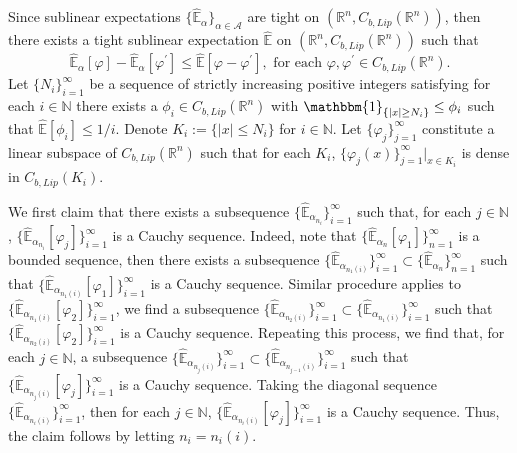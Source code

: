 \documentclass[a4paper,oneside,10pt]{article}%
\numberwithin{equation}{section}
\begin{document}
Since sublinear expectations $\{ \mathbb{\hat{E}}_{\alpha}\}_{\alpha
\in \mathcal{A}}$ are tight on $(\mathbb{R}^{n},C_{b,Lip}(\mathbb{R}^{n}))$,
then there exists a tight sublinear expectation $\mathbb{\hat{E}}$ on
$(\mathbb{R}^{n},C_{b,Lip}(\mathbb{R}^{n}))$ such that
\[
\mathbb{\hat{E}}_{\alpha}[\varphi]-\mathbb{\hat{E}}_{\alpha}[\varphi^{\prime
}]\leq \mathbb{\hat{E}}[\varphi-\varphi^{\prime}],\text{ for each }%
\varphi,\varphi^{\prime}\in C_{b,Lip}(\mathbb{R}^{n}).
\]
Let $\{N_{i}\}_{i=1}^{\infty}$ be a sequence of strictly increasing positive
integers satisfying for each $i\in \mathbb{N}$ there exists a $\phi_{i}\in
C_{b,Lip}(\mathbb{R}^{n})$ with $\mathbbm{1}_{\{|x|\geq N_{i}\}}\leq \phi_{i}$
such that $\mathbb{\hat{E}}[\phi_{i}]\leq1/i$. Denote $K_{i}:=\{|x|\leq
N_{i}\}$ for $i\in \mathbb{N}$. Let $\{ \varphi_{j}\}_{j=1}^{\infty}$
constitute a linear subspace of $C_{b,Lip}(\mathbb{R}^{n})$ such that for each
$K_{i}$, $\{ \varphi_{j}(x)\}_{j=1}^{\infty}|_{x\in K_{i}}$ is dense in
$C_{b,Lip}(K_{i})$.

We first claim that there exists a subsequence $\{ \mathbb{\hat{E}}%
_{\alpha_{n_{i}}}\}_{i=1}^{\infty}$ such that, for each $j\in \mathbb{N}$, $\{
\mathbb{\hat{E}}_{\alpha_{n_{i}}}[\varphi_{j}]\}_{i=1}^{\infty}$ is a Cauchy
sequence. Indeed, note that $\{ \mathbb{\hat{E}}_{\alpha_{n}}[\varphi
_{1}]\}_{n=1}^{\infty}$ is a bounded sequence, then there exists a subsequence
$\{ \mathbb{\hat{E}}_{\alpha_{n_{1}(i)}}\}_{i=1}^{\infty}\subset \{
\mathbb{\hat{E}}_{\alpha_{n}}\}_{n=1}^{\infty}$ such that $\{ \mathbb{\hat{E}%
}_{\alpha_{n_{1}(i)}}[\varphi_{1}]\}_{i=1}^{\infty}$ is a Cauchy sequence.
Similar procedure applies to $\{ \mathbb{\hat{E}}_{\alpha_{n_{1}(i)}}%
[\varphi_{2}]\}_{i=1}^{\infty}$, we find a subsequence $\{ \mathbb{\hat{E}%
}_{\alpha_{n_{2}(i)}}\}_{i=1}^{\infty}\subset \{ \mathbb{\hat{E}}%
_{\alpha_{n_{1}(i)}}\}_{i=1}^{\infty}$ such that $\{ \mathbb{\hat{E}}%
_{\alpha_{n_{2}(i)}}[\varphi_{2}]\}_{i=1}^{\infty}$ is a Cauchy sequence.
Repeating this process, we find that, for each $j\in \mathbb{N}$, a subsequence
$\{ \mathbb{\hat{E}}_{\alpha_{n_{j}(i)}}\}_{i=1}^{\infty}\subset \{
\mathbb{\hat{E}}_{\alpha_{n_{j-1}(i)}}\}_{i=1}^{\infty}$ such that $\{
\mathbb{\hat{E}}_{\alpha_{n_{j}(i)}}[\varphi_{j}]\}_{i=1}^{\infty}$ is a
Cauchy sequence. Taking the diagonal sequence $\{ \mathbb{\hat{E}}%
_{\alpha_{n_{i}(i)}}\}_{i=1}^{\infty}$, then for each $j\in \mathbb{N}$, $\{
\mathbb{\hat{E}}_{\alpha_{n_{i}(i)}}[\varphi_{j}]\}_{i=1}^{\infty}$ is a
Cauchy sequence. Thus, the claim follows by letting $n_{i}=n_{i}(i)$.
\end{document}
